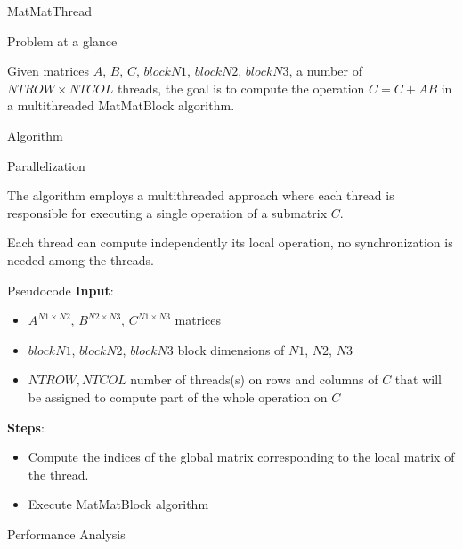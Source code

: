 \begin{chapter}{MatMatThread}
    \begin{section}{Problem at a glance}
        \par Given matrices $A$, $B$, $C$, $blockN1$, $blockN2$, $blockN3$, a number of $NTROW \times NTCOL$ threads, the goal is to compute the  operation $C = C + AB$ in a multithreaded MatMatBlock algorithm.
    \end{section}
    \begin{section}{Algorithm}
        \begin{subsection}{Parallelization}
            \par The algorithm employs a multithreaded approach where each thread is responsible for executing a single  operation of a submatrix $C$.
            \par Each thread can compute independently its local  operation, no synchronization is needed among the threads.
        \end{subsection}
        \begin{subsection}{Pseudocode}
            \textbf{Input}:
            \begin{itemize}
                \item $A^{N1 \times N2}$, $B^{N2 \times N3}$, $C^{N1 \times N3}$ matrices
                \item $blockN1$, $blockN2$, $blockN3$ block dimensions of $N1$, $N2$, $N3$
                \item $NTROW, NTCOL$ number of threads(s) on rows and columns of $C$ that will be assigned to compute part of the whole  operation on $C$
            \end{itemize}
            \textbf{Steps}:
            \begin{itemize}
                \item Compute the indices of the global matrix corresponding to the local matrix of the thread.
                \item Execute MatMatBlock algorithm
            \end{itemize}
            
        \end{subsection}
        \begin{figure}[ht]
            \centering
            
            \label{fig:matmatthread}
        \end{figure}
        \clearpage
        \begin{subsection}{Performance Analysis}

\end{subsection}
\end{section}
\end{chapter}
